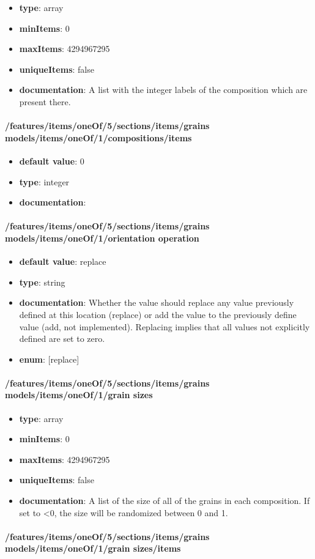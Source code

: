\begin{itemize}\item {\bf type}: array
\item {\bf minItems}: 0
\item {\bf maxItems}: 4294967295
\item {\bf uniqueItems}: false
\item {\bf documentation}: A list with the integer labels of the composition which are present there.
\end{itemize}\paragraph{/features/items/oneOf/5/sections/items/grains models/items/oneOf/1/compositions/items}
\begin{itemize}\item {\bf default value}: 0
\item {\bf type}: integer
\item {\bf documentation}: 
\end{itemize}\paragraph{/features/items/oneOf/5/sections/items/grains models/items/oneOf/1/orientation operation}
\begin{itemize}\item {\bf default value}: replace
\item {\bf type}: string
\item {\bf documentation}: Whether the value should replace any value previously defined at this location (replace) or add the value to the previously define value (add, not implemented). Replacing implies that all values not explicitly defined are set to zero.
\item {\bf enum}: [replace]\end{itemize}\paragraph{/features/items/oneOf/5/sections/items/grains models/items/oneOf/1/grain sizes}
\begin{itemize}\item {\bf type}: array
\item {\bf minItems}: 0
\item {\bf maxItems}: 4294967295
\item {\bf uniqueItems}: false
\item {\bf documentation}: A list of the size of all of the grains in each composition. If set to <0, the size will be randomized between 0 and 1.
\end{itemize}\paragraph{/features/items/oneOf/5/sections/items/grains models/items/oneOf/1/grain sizes/items}
